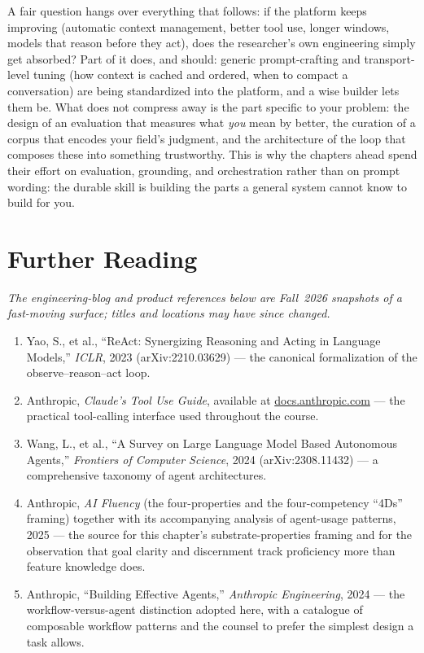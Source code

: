 \begin{remark}
A fair question hangs over everything that follows: if the platform keeps improving (automatic context management, better tool use, longer windows, models that reason before they act), does the researcher's own engineering simply get absorbed?
Part of it does, and should: generic prompt-crafting and transport-level tuning (how context is cached and ordered, when to compact a conversation) are being standardized into the platform, and a wise builder lets them be.
What does not compress away is the part specific to your problem: the design of an evaluation that measures what \emph{you} mean by better, the curation of a corpus that encodes your field's judgment, and the architecture of the loop that composes these into something trustworthy.
This is why the chapters ahead spend their effort on evaluation, grounding, and orchestration rather than on prompt wording: the durable skill is building the parts a general system cannot know to build for you.
\end{remark}

\section*{Further Reading}

\emph{The engineering-blog and product references below are Fall~2026 snapshots of a fast-moving surface; titles and locations may have since changed.}

\begin{small}
\begin{enumerate}
\item Yao, S., et al., ``ReAct: Synergizing Reasoning and Acting in Language Models,'' \emph{ICLR}, 2023 (arXiv:2210.03629) — the canonical formalization of the observe–reason–act loop.
\item Anthropic, \emph{Claude's Tool Use Guide}, available at \href{https://docs.anthropic.com}{docs.anthropic.com} — the practical tool-calling interface used throughout the course.
\item Wang, L., et al., ``A Survey on Large Language Model Based Autonomous Agents,'' \emph{Frontiers of Computer Science}, 2024 (arXiv:2308.11432) — a comprehensive taxonomy of agent architectures.
\item Anthropic, \emph{AI Fluency} (the four-properties and the four-competency ``4Ds'' framing) together with its accompanying analysis of agent-usage patterns, 2025 — the source for this chapter's substrate-properties framing and for the observation that goal clarity and discernment track proficiency more than feature knowledge does.
\item Anthropic, ``Building Effective Agents,'' \emph{Anthropic Engineering}, 2024 — the workflow-versus-agent distinction adopted here, with a catalogue of composable workflow patterns and the counsel to prefer the simplest design a task allows.
\end{enumerate}
\end{small}
